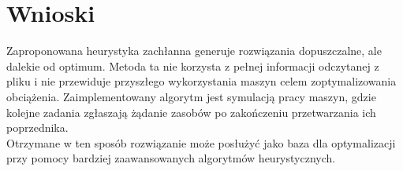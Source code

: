 \documentclass[10pt,a4paper]{article}
\begin{document}
\section{Wnioski}
Zaproponowana heurystyka zachłanna generuje rozwiązania dopuszczalne, ale dalekie od optimum. Metoda ta nie korzysta z pełnej informacji odczytanej z pliku i nie przewiduje przyszłego wykorzystania maszyn celem zoptymalizowania obciążenia. Zaimplementowany algorytm jest symulacją pracy maszyn, gdzie kolejne zadania zgłaszają żądanie zasobów po zakończeniu przetwarzania ich poprzednika.\\
Otrzymane w ten sposób rozwiązanie może posłużyć jako baza dla optymalizacji przy pomocy bardziej zaawansowanych algorytmów heurystycznych.
\end{document}
